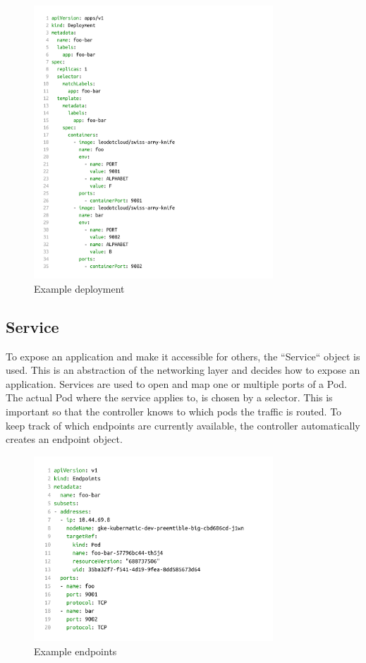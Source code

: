 \begin{figure}[H]
    \centering
    \includegraphics[width=0.8\textwidth, left]{media/02/deployment}
    \caption{Example deployment}
    \label{fig:deployment}
\end{figure}


\subsection{Service}
To expose an application and make it accessible for others, the ``Service`` object is used.
This is an abstraction of the networking layer and decides how to expose an application.
Services are used to open and map one or multiple ports of a Pod.
The actual Pod where the service applies to, is chosen by a selector.
This is important so that the controller knows to which pods the traffic is routed.
To keep track of which endpoints are currently available, the controller automatically creates an endpoint object.

\begin{figure}[H]
    \centering
    \includegraphics[width=0.8\textwidth, left]{media/02/endpoint}
    \caption{Example endpoints}
    \label{fig:endpoints}
\end{figure}

